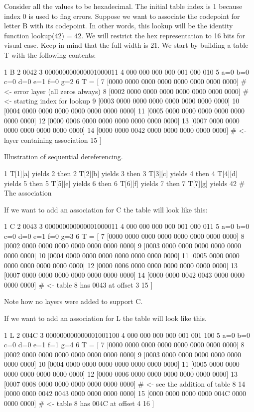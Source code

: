 Consider all the values to be hexadecimal. The initial table index is 1 because index 0 is used to flag errors. Suppose we want to associate the codepoint for letter \textquotesingle{}B\textquotesingle{} with its codepoint. In other words, this lookup will be the identity function lookup(42) = 42. We will restrict the hex representation to 16 bits for visual ease. Keep in mind that the full width is 21. We start by building a table T with the following contents\+: 
\begin{DoxyCode}
1 B
2 0042
3 000000000000001000011
4 000 000 000 000 001 000 010
5 a=0 b=0 c=0 d=0 e=1 f=0 g=2
6 T = [
7  [0000 0000 0000 0000 0000 0000 0000 0000]  # <- error layer (all zeros always)
8  [0002 0000 0000 0000 0000 0000 0000 0000]  # <- starting index for lookup
9  [0003 0000 0000 0000 0000 0000 0000 0000]
10  [0004 0000 0000 0000 0000 0000 0000 0000]
11  [0005 0000 0000 0000 0000 0000 0000 0000]
12  [0000 0006 0000 0000 0000 0000 0000 0000]
13  [0007 0000 0000 0000 0000 0000 0000 0000]
14  [0000 0000 0042 0000 0000 0000 0000 0000]  # <- layer containing association
15 ]
\end{DoxyCode}


Illustration of sequential dereferencing. 
\begin{DoxyCode}
1 T[1][a] yields 2 then
2 T[2][b] yields 3 then
3 T[3][c] yields 4 then
4 T[4][d] yields 5 then
5 T[5][e] yields 6 then
6 T[6][f] yields 7 then
7 T[7][g] yields 42  # The association
\end{DoxyCode}


If we want to add an association for \textquotesingle{}C\textquotesingle{} the table will look like this\+: 
\begin{DoxyCode}
1 C
2 0043
3 000000000000001000011
4 000 000 000 000 001 000 011
5 a=0 b=0 c=0 d=0 e=1 f=0 g=3
6 T = [
7  [0000 0000 0000 0000 0000 0000 0000 0000]
8  [0002 0000 0000 0000 0000 0000 0000 0000]
9  [0003 0000 0000 0000 0000 0000 0000 0000]
10  [0004 0000 0000 0000 0000 0000 0000 0000]
11  [0005 0000 0000 0000 0000 0000 0000 0000]
12  [0000 0006 0000 0000 0000 0000 0000 0000]
13  [0007 0000 0000 0000 0000 0000 0000 0000]
14  [0000 0000 0042 0043 0000 0000 0000 0000] # <- table 8 has 0043 at offset 3
15 ]
\end{DoxyCode}
 Note how no layers were added to support \textquotesingle{}C\textquotesingle{}.

If we want to add an association for \textquotesingle{}L\textquotesingle{} the table will look like this. 
\begin{DoxyCode}
1 L
2 004C
3 000000000000001001100
4 000 000 000 000 001 001 100
5 a=0 b=0 c=0 d=0 e=1 f=1 g=4
6 T = [
7  [0000 0000 0000 0000 0000 0000 0000 0000]
8  [0002 0000 0000 0000 0000 0000 0000 0000]
9  [0003 0000 0000 0000 0000 0000 0000 0000]
10  [0004 0000 0000 0000 0000 0000 0000 0000]
11  [0005 0000 0000 0000 0000 0000 0000 0000]
12  [0000 0006 0000 0000 0000 0000 0000 0000]
13  [0007 0008 0000 0000 0000 0000 0000 0000] # <- see the addition of table 8
14  [0000 0000 0042 0043 0000 0000 0000 0000]
15  [0000 0000 0000 0000 004C 0000 0000 0000] # <- table 8 has 004C at offset 4
16 ]
\end{DoxyCode}


